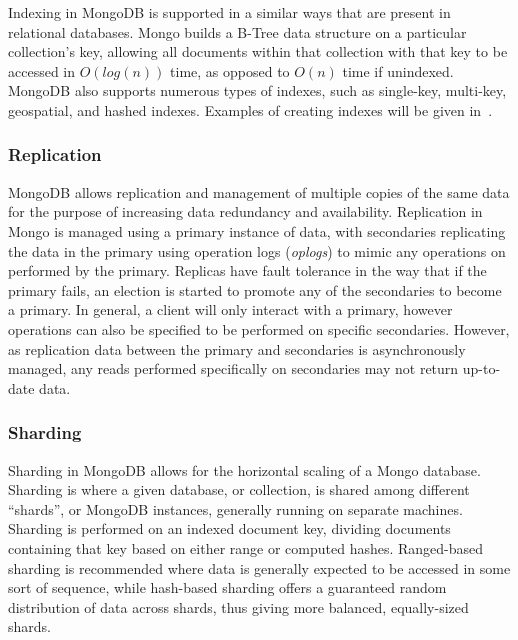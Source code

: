 \documentclass[a4paper,11pt]{article}
\begin{document}
Indexing in MongoDB is supported in a similar ways that are present in relational databases. Mongo builds a B-Tree data
structure on a particular collection's key, allowing all documents within that collection with that key to be accessed
in $O(log(n))$ time, as opposed to $O(n)$ time if unindexed. MongoDB also supports numerous types of indexes, such as
single-key, multi-key, geospatial, and hashed indexes. Examples of creating indexes will be given in~.



\subsubsection{Replication} %
\label{ssub:replication}

MongoDB allows replication and management of multiple copies of the same data for the purpose of increasing data
redundancy and availability. Replication in Mongo is managed using a primary instance of data, with secondaries replicating
the data in the primary using operation logs (\textit{oplogs}) to mimic any operations on performed by the primary.
Replicas have fault tolerance in the way that if the primary fails, an election is started to promote any of the
secondaries to become a primary. In general, a client will only interact with a primary, however operations can also be
specified to be performed on specific secondaries. However, as replication data between the primary and secondaries is asynchronously managed, any reads
performed specifically on secondaries may not return up-to-date data.



\subsubsection{Sharding} %
\label{ssub:sharding}

Sharding in MongoDB allows for the horizontal scaling of a Mongo database. Sharding is where a given database, or collection, is shared
among different ``shards'', or MongoDB instances, generally running on separate machines. Sharding is performed
on an indexed document key, dividing documents containing that key based on either range or computed hashes. Ranged-based
sharding is recommended where data is generally expected to be accessed in some sort of sequence, while hash-based
sharding offers a guaranteed random distribution of data across shards, thus giving more balanced, equally-sized shards.
\end{document}
